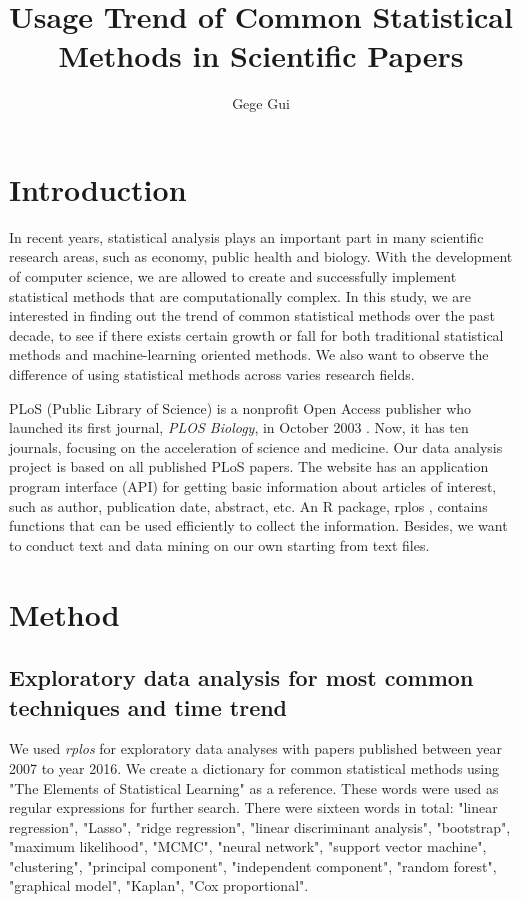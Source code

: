 \documentclass[11pt]{article}
\title{Usage Trend of Common Statistical Methods in Scientific Papers \vspace{-2ex}}
\date{\vspace{-5ex}}
\author{Gege Gui}
\begin{document}
\maketitle
\newcommand{\code}[1]{\texttt{#1}}
\newcommand{\Var}{\mathrm{Var}}
\newcommand{\logit}{\mathrm{logit}}
\newcommand{\alone}{[{\bf ALONE}]~}

\section{Introduction}
In recent years, statistical analysis plays an important part in many scientific research areas, such as economy, public health and biology. With the development of computer science, we are allowed to create and successfully implement statistical methods that are computationally complex. In this study, we are interested in finding out the trend of common statistical methods over the past decade, to see if there exists certain growth or fall for both traditional statistical methods and machine-learning oriented methods. We also want to observe the difference of using statistical methods across varies research fields. 

PLoS (Public Library of Science) is a nonprofit Open Access publisher who launched its first journal, \textit{PLOS Biology}, in October 2003 \cite{plos}. Now, it has ten journals, focusing on the acceleration of science and medicine. Our data analysis project is based on all published PLoS papers. The website has an application program interface (API) for getting basic information about articles of interest, such as author, publication date, abstract, etc. An R package, rplos \cite{rplos}, contains functions that can be used efficiently to collect the information. Besides, we want to conduct text and data mining on our own starting from text files. 

\section{Method}
\subsection{Exploratory data analysis for most common techniques and time trend}

We used \textit{rplos} for exploratory data analyses with papers published between year 2007 to year 2016. We create a dictionary for common statistical methods using "The Elements of Statistical Learning"\cite{methodbook} as a reference. These words were used as regular expressions for further search. There were sixteen words in total: "linear regression", "Lasso", "ridge regression", "linear discriminant analysis", "bootstrap", "maximum likelihood", "MCMC", "neural network", "support vector machine", "clustering", "principal component", "independent component", "random forest", "graphical model", "Kaplan", "Cox proportional". 
\end{document}
